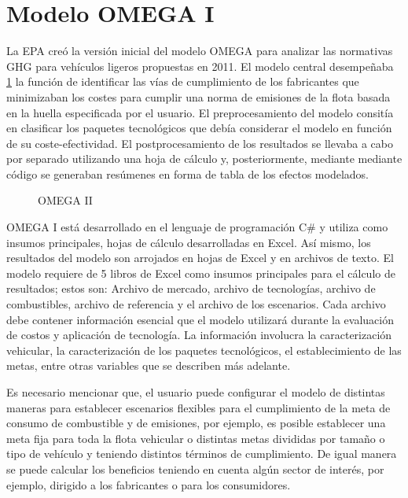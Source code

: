 \section{Modelo OMEGA I}
\label{sec:omega}

La EPA creó la versión inicial del modelo OMEGA para analizar las normativas GHG para vehículos ligeros propuestas en 2011. El modelo central desempeñaba \ref{fig:omega1} la función de identificar las vías de cumplimiento de los fabricantes que minimizaban los costes para cumplir una norma de emisiones de la flota basada en la huella especificada por el usuario. El preprocesamiento del modelo consitía en clasificar los paquetes tecnológicos que debía considerar el modelo en función de su coste-efectividad. El postprocesamiento de los resultados se llevaba a cabo por separado utilizando una hoja de cálculo y, posteriormente, mediante mediante código se generaban resúmenes en forma de tabla de los efectos modelados.

\begin{figure}[htbp]
   \centering
   
    \caption{OMEGA II}
    \label{fig:omega1}
\end{figure}

OMEGA I está desarrollado en el lenguaje de programación C\# y utiliza como insumos principales, hojas de cálculo desarrolladas en Excel. Así mismo, los resultados del modelo son arrojados en hojas de Excel y en archivos de texto. El modelo requiere de 5 libros de Excel como insumos principales para el cálculo de resultados; estos son: Archivo de mercado, archivo de tecnologías, archivo de combustibles, archivo de referencia y el archivo de los escenarios. Cada archivo debe contener información esencial que el modelo utilizará durante la evaluación de costos y aplicación de tecnología. La información involucra la caracterización vehicular, la caracterización de los paquetes tecnológicos, el establecimiento de las metas, entre otras variables que se describen más adelante.  \label{Actualizar Información} \label{Informe Final}

Es necesario mencionar que, el usuario puede configurar el modelo de distintas maneras para establecer escenarios flexibles para el cumplimiento de la meta de consumo de combustible y de emisiones, por ejemplo, es posible establecer una meta fija para toda la flota vehicular o distintas metas divididas por tamaño o tipo de vehículo y teniendo distintos términos de cumplimiento. De igual manera se puede calcular los beneficios teniendo en cuenta algún sector de interés, por ejemplo, dirigido a los fabricantes o para los consumidores.  

